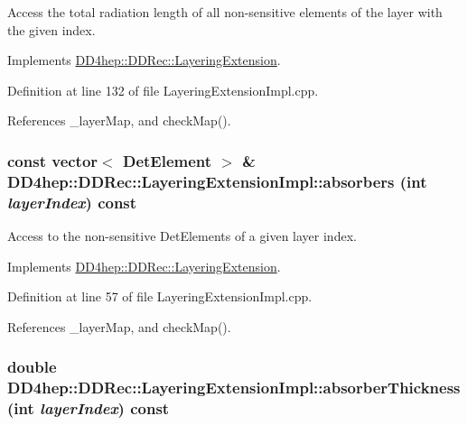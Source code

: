 Access the total radiation length of all non-\/sensitive elements of the layer with the given index. 

Implements \hyperlink{class_d_d4hep_1_1_d_d_rec_1_1_layering_extension_aca33441136624022aa7414895ba81fef}{DD4hep::DDRec::LayeringExtension}.

Definition at line 132 of file LayeringExtensionImpl.cpp.

References \_\-layerMap, and checkMap().\hypertarget{class_d_d4hep_1_1_d_d_rec_1_1_layering_extension_impl_ab7007d1f2250d46b4fe6ad14213c40dd}{
\subsubsection[{absorbers}]{\setlength{\rightskip}{0pt plus 5cm}const vector$<$ {\bf DetElement} $>$ \& DD4hep::DDRec::LayeringExtensionImpl::absorbers (int {\em layerIndex}) const}}
\label{class_d_d4hep_1_1_d_d_rec_1_1_layering_extension_impl_ab7007d1f2250d46b4fe6ad14213c40dd}


Access to the non-\/sensitive DetElements of a given layer index. 

Implements \hyperlink{class_d_d4hep_1_1_d_d_rec_1_1_layering_extension_a1204ac80c52fbca9ce3f71e2b3662eab}{DD4hep::DDRec::LayeringExtension}.

Definition at line 57 of file LayeringExtensionImpl.cpp.

References \_\-layerMap, and checkMap().\hypertarget{class_d_d4hep_1_1_d_d_rec_1_1_layering_extension_impl_ad3189cae9f334260aa6fd17b45b1c8eb}{
\subsubsection[{absorberThickness}]{\setlength{\rightskip}{0pt plus 5cm}double DD4hep::DDRec::LayeringExtensionImpl::absorberThickness (int {\em layerIndex}) const}}
\label{class_d_d4hep_1_1_d_d_rec_1_1_layering_extension_impl_ad3189cae9f334260aa6fd17b45b1c8eb}


